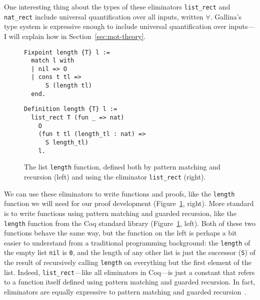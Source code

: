 One interesting thing about the types of these eliminators \lstinline{list_rect} and \lstinline{nat_rect}
include universal quantification over all inputs, written $\forall$.
Gallina's type system is expressive enough to include universal quantification over inputs---I will explain how
in Section~\ref{sec:mot-theory}.

\begin{figure}
\begin{minipage}{0.42\textwidth}
\begin{lstlisting}
Fixpoint length {T} l :=
  match l with
  | nil => O
  | cons t tl =>
      S (length tl)
  end.
\end{lstlisting}
\end{minipage}
\hfill
\begin{minipage}{0.54\textwidth}
\begin{lstlisting}
Definition length {T} l :=
  list_rect T (fun _ => nat)
    O
    (fun t tl (length_tl : nat) =>
      S length_tl)
    l.
\end{lstlisting}
\end{minipage}
\caption{The list \lstinline{length} function, defined both by pattern matching and recursion (left) and using the eliminator \lstinline{list_rect} (right).}
\label{fig:length}
\end{figure}

We can use these eliminators to write functions and proofs, like the \lstinline{length} function we will need for our proof development (Figure~\ref{fig:length}, right).
More standard is to write functions using pattern matching and guarded recursion, like the \lstinline{length} function from the Coq standard library (Figure~\ref{fig:length}, left).
Both of these two functions behave the same way, but the function on the left is perhaps a bit easier to understand from a traditional programming background:
the \lstinline{length} of the empty list \lstinline{nil} is \lstinline{0}, and the length of any other list
is just the successor (\lstinline{S}) of the result of recursively calling \lstinline{length} on everything but the first element of the list.
Indeed, \lstinline{list_rect}---like all eliminators in Coq---is just a constant that refers to a function itself defined using pattern matching and guarded recursion.
In fact, eliminators are equally expressive to pattern matching and guarded recursion~\cite{TODO}. %

